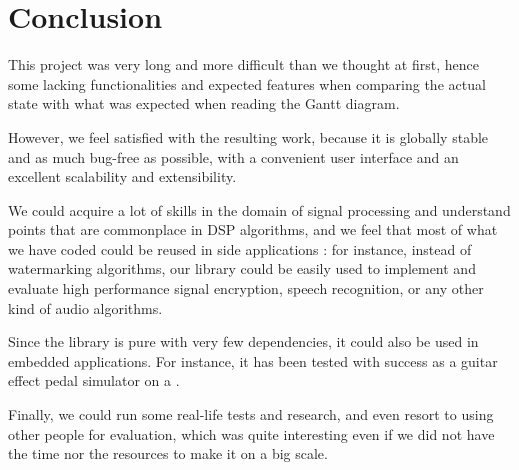 \chapter*{Conclusion}
This project was very long and more difficult than we thought at first, hence some lacking functionalities and expected features when comparing the actual state with what was expected when reading the Gantt diagram.

However, we feel satisfied with the resulting work, because it is globally stable and as much bug-free as possible, with a convenient user interface and an excellent scalability and extensibility.

We could acquire a lot of skills in the domain of signal processing and understand points that are commonplace in DSP algorithms, and we feel that most of what we have coded could be reused in side applications : for instance, instead of watermarking algorithms, our library could be easily used to implement and evaluate high performance signal encryption, speech recognition, or any other kind of audio algorithms.

Since the library is pure  with very few dependencies, it could also be used in embedded applications. For instance, it has been tested with success as a guitar effect pedal simulator on a .

Finally, we could run some real-life tests and research, and even resort to using other people for evaluation, which was quite interesting even if we did not have the time nor the resources to make it on a big scale.